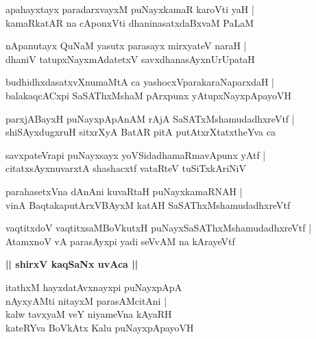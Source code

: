 \documentclass[twoside,12pt,openright]{book}
\newcounter{shloka}[chapter]
\def\uvaca#1{\centerline{{\large\textbf{#1}}}}
\begin{document}
\begin{shloka}%
apahayxtayx paradarxvayxM puNayxkamaR karoVti yaH |\\
kamaRkatAR na cAponxVti dhaninasatxdaBxvaM PaLaM 
\end{shloka}

\begin{shloka}%
nApanutayx QuNaM yasutx parasayx mirxyateV naraH |\\
dhaniV tatupxNayxmAdatetxV savxdhanasAyxnUrUpataH 
\end{shloka}

\begin{shloka}%
budhidhxdasatxvXnumaMtA ca yashocxVparakaraNaparxdaH |\\
balakaqcACxpi SaSAThxMshaM pArxpunx yAtupxNayxpApayoVH 
\end{shloka}

\begin{shloka}%
parxjABayxH puNayxpApAnAM rAjA SaSATxMshamudadhxreVtf |\\
shiSAyxdugxruH sitxrXyA BatAR pitA putAtxrXtatxtheYva ca 
\end{shloka}

\begin{shloka}%
savxpateVrapi puNayxsayx yoVSidadhamaRmavApunx yAtf |\\
citatxsAyxnuvarxtA shashacxtf vataRteV tuSiTxkAriNiV
\end{shloka}

\begin{shloka}%
parahasetxVna dAnAni kuvaRtaH puNayxkamaRNAH |\\
vinA BaqtakaputArxVBAyxM katAH SaSAThxMshamudadhxreVtf
\end{shloka}

\begin{shloka}%
vaqtitxdoV vaqtitxsaMBoVkutxH puNayxSaSAThxMshamudadhxreVtf |\\
AtamxnoV vA parasAyxpi yadi seVvAM na kArayeVtf
\end{shloka}

\uvaca{|| shirxV kaqSaNx uvAca ||}

\begin{shloka}%
itathxM hayxdatAvxnayxpi puNayxpApA \\
nAyxyAMti nitayxM parasAMcitAni |\\
kalw tavxyaM veY niyameVna kAyaRH \\
kateRYva BoVkAtx Kalu puNayxpApayoVH 
\end{shloka}
\end{document}
